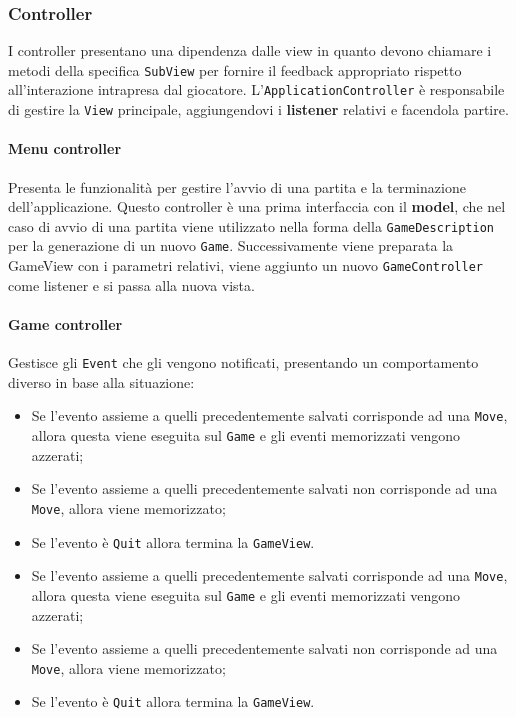 \subsubsection{Controller}
I controller presentano una dipendenza dalle view in quanto devono chiamare i metodi della specifica \texttt{SubView} per fornire il feedback appropriato rispetto all'interazione intrapresa dal giocatore.
%
L'\texttt{ApplicationController} è responsabile di gestire la \texttt{View} principale, aggiungendovi i \textbf{listener} relativi e facendola partire.
\paragraph{Menu controller}
%
Presenta le funzionalità per gestire l'avvio di una partita e la terminazione dell'applicazione.
%
Questo controller è una prima interfaccia con il \textbf{model}, che nel caso di avvio di una partita viene utilizzato nella forma della \texttt{GameDescription} per la generazione di un nuovo \texttt{Game}.
%
Successivamente viene preparata la GameView con i parametri relativi, viene aggiunto un nuovo \texttt{GameController} come listener e si passa alla nuova vista.
\paragraph{Game controller}
%
Gestisce gli \texttt{Event} che gli vengono notificati, presentando un comportamento diverso in base alla situazione:
\begin{itemize}
    \item Se l'evento assieme a quelli precedentemente salvati corrisponde ad una \texttt{Move}, allora questa viene eseguita sul \texttt{Game} e gli eventi memorizzati vengono azzerati;
    \item Se l'evento assieme a quelli precedentemente salvati non corrisponde ad una \texttt{Move}, allora viene memorizzato;
    \item Se l'evento è \texttt{Quit} allora termina la \texttt{GameView}.
\end{itemize}
\begin{itemize}
    \item Se l'evento assieme a quelli precedentemente salvati corrisponde ad una \texttt{Move}, allora questa viene eseguita sul \texttt{Game} e gli eventi memorizzati vengono azzerati;
    \item Se l'evento assieme a quelli precedentemente salvati non corrisponde ad una \texttt{Move}, allora viene memorizzato;
    \item Se l'evento è \texttt{Quit} allora termina la \texttt{GameView}.
\end{itemize}
